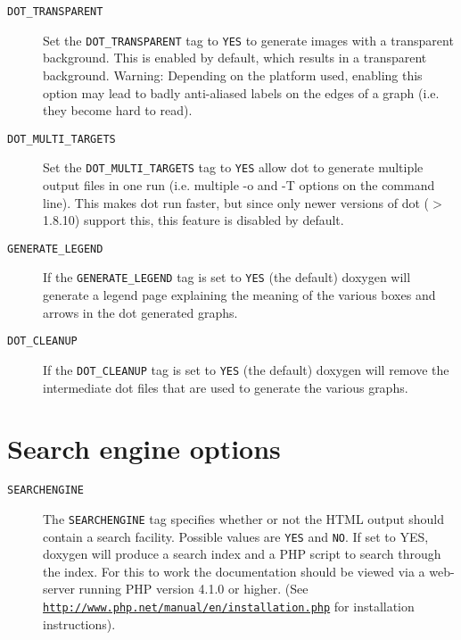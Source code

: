 \begin{description}
\label{config_cfg_dot_transparent}
\hypertarget{config_cfg_dot_transparent}{}
 \item[{\tt DOT\_\-TRANSPARENT} ] Set the {\tt DOT\_\-TRANSPARENT} tag to {\tt YES} to generate images with a transparent background. This is enabled by default, which results in a transparent background. Warning: Depending on the platform used, enabling this option may lead to badly anti-aliased labels on the edges of a graph (i.e. they become hard to read).

\label{config_cfg_dot_multi_targets}
\hypertarget{config_cfg_dot_multi_targets}{}
 \item[{\tt DOT\_\-MULTI\_\-TARGETS} ] Set the {\tt DOT\_\-MULTI\_\-TARGETS} tag to {\tt YES} allow dot to generate multiple output files in one run (i.e. multiple -o and -T options on the command line). This makes dot run faster, but since only newer versions of dot ($>$1.8.10) support this, this feature is disabled by default.

\label{config_cfg_generate_legend}
\hypertarget{config_cfg_generate_legend}{}
 \item[{\tt GENERATE\_\-LEGEND} ] If the {\tt GENERATE\_\-LEGEND} tag is set to {\tt YES} (the default) doxygen will generate a legend page explaining the meaning of the various boxes and arrows in the dot generated graphs.

\label{config_cfg_dot_cleanup}
\hypertarget{config_cfg_dot_cleanup}{}
 \item[{\tt DOT\_\-CLEANUP} ] If the {\tt DOT\_\-CLEANUP} tag is set to {\tt YES} (the default) doxygen will remove the intermediate dot files that are used to generate the various graphs.

\end{description}
\hypertarget{config_config_search}{}\section{Search engine options}\label{config_config_search}
\label{config_cfg_searchengine}
\hypertarget{config_cfg_searchengine}{}
 \begin{description}
\item[{\tt SEARCHENGINE} ] The {\tt SEARCHENGINE} tag specifies whether or not the HTML output should contain a search facility. Possible values are {\tt YES} and {\tt NO}. If set to YES, doxygen will produce a search index and a PHP script to search through the index. For this to work the documentation should be viewed via a web-server running PHP version 4.1.0 or higher. (See \href{http://www.php.net/manual/en/installation.php}{\tt http://www.php.net/manual/en/installation.php} for installation instructions).

\end{description}
